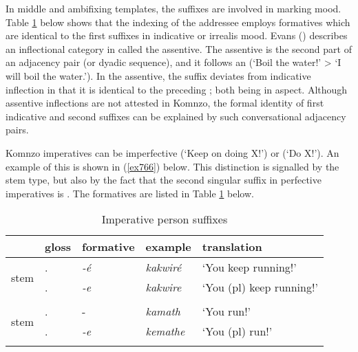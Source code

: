 In middle and ambifixing templates, the  suffixes are involved in marking  mood. Table \ref{perssuffimp} below shows that the indexing of the addressee employs formatives which are identical to the first  suffixes in indicative or irrealis mood. Evans (\citeyear{Evans:2012ue}) describes an inflectional category in  called the assentive. The assentive is the second part of an adjacency pair (or dyadic sequence), and it follows an  (`Boil the water!' > `I will boil the water.'). In the assentive, the  suffix deviates from indicative inflection in that it is identical to the preceding ; both being  in  aspect. Although assentive inflections are not attested in Komnzo, the formal identity of first  indicative and second   suffixes can be explained by such conversational adjacency pairs.%

Komnzo imperatives can be imperfective (`Keep on doing X!') or  (`Do X!'). An example of this is shown in (\ref{ex766}) below. This distinction is signalled by the stem type, but also by the fact that the second singular suffix in perfective imperatives is . The formatives are listed in Table \ref{perssuffimp} below.

\begin{table}
\caption{Imperative person suffixes}
\label{perssuffimp}
	\begin{tabular}{lllll}
		\lsptoprule
		&{gloss} &{formative} &{example} &{translation}\\\midrule
		\multirow{2}{*}{\Ext{} stem} &\Ssg.\Imp &\emph{-é}	&\emph{kakwiré} &`You keep running!'\\
		&\Snsg.\Imp	&\emph{-e} &\emph{kakwire} &`You (pl) keep running!'\\
		&&&&\\
		\multirow{2}{*}{\Rs{} stem} &\Ssg.\Imp &-\Zero &\emph{kamath} &`You run!'\\
		&\Snsg.\Imp	&\emph{-e} &\emph{kemathe} &`You (pl) run!'\\
		\lspbottomrule
	\end{tabular}
\end{table}%

